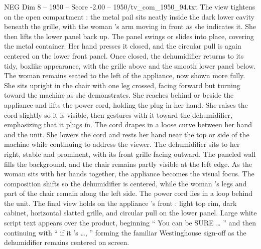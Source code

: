 \begin{textsample}{NEG Dim 8 – 1950 – Score -2.00 – 1950/tv\_com\_1950\_94.txt}
The view tightens on the open compartment : the metal pail sits neatly inside the dark lower cavity beneath the grille, with the woman ’s arm moving in front as she indicates it.
She then lifts the lower panel back up.
The panel swings or slides into place, covering the metal container.
Her hand presses it closed, and the circular pull is again centered on the lower front panel.
Once closed, the dehumidifier returns to its tidy, boxlike appearance, with the grille above and the smooth lower panel below.
The woman remains seated to the left of the appliance, now shown more fully.
She sits upright in the chair with one leg crossed, facing forward but turning toward the machine as she demonstrates.
She reaches behind or beside the appliance and lifts the power cord, holding the plug in her hand.
She raises the cord slightly so it is visible, then gestures with it toward the dehumidifier, emphasizing that it plugs in.
The cord drapes in a loose curve between her hand and the unit.
She lowers the cord and rests her hand near the top or side of the machine while continuing to address the viewer.
The dehumidifier sits to her right, stable and prominent, with its front grille facing outward.
The paneled wall fills the background, and the chair remains partly visible at the left edge.
As the woman sits with her hands together, the appliance becomes the visual focus.
The composition shifts so the dehumidifier is centered, while the woman ’s legs and part of the chair remain along the left side.
The power cord lies in a loop behind the unit.
The final view holds on the appliance ’s front : light top rim, dark cabinet, horizontal slatted grille, and circular pull on the lower panel.
Large white script text appears over the product, beginning “ You can be SURE … ” and then continuing with “ if it ’s …, ” forming the familiar Westinghouse sign-off as the dehumidifier remains centered on screen.

\end{textsample}
